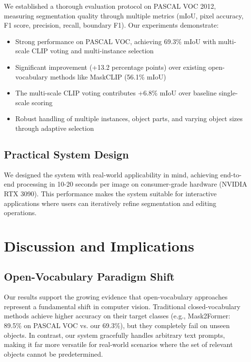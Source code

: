 We established a thorough evaluation protocol on PASCAL VOC 2012, measuring segmentation quality through multiple metrics (mIoU, pixel accuracy, F1 score, precision, recall, boundary F1). Our experiments demonstrate:

\begin{itemize}
    \item Strong performance on PASCAL VOC, achieving 69.3\% mIoU with multi-scale CLIP voting and multi-instance selection
    \item Significant improvement (+13.2 percentage points) over existing open-vocabulary methods like MaskCLIP (56.1\% mIoU)
    \item The multi-scale CLIP voting contributes +6.8\% mIoU over baseline single-scale scoring
    \item Robust handling of multiple instances, object parts, and varying object sizes through adaptive selection
\end{itemize}

\subsection{Practical System Design}

We designed the system with real-world applicability in mind, achieving end-to-end processing in 10-20 seconds per image on consumer-grade hardware (NVIDIA RTX 3090). This performance makes the system suitable for interactive applications where users can iteratively refine segmentation and editing operations.

\section{Discussion and Implications}

\subsection{Open-Vocabulary Paradigm Shift}

Our results support the growing evidence that open-vocabulary approaches represent a fundamental shift in computer vision. Traditional closed-vocabulary methods achieve higher accuracy on their target classes (e.g., Mask2Former: 89.5\% on PASCAL VOC vs. our 69.3\%), but they completely fail on unseen objects. In contrast, our system gracefully handles arbitrary text prompts, making it far more versatile for real-world scenarios where the set of relevant objects cannot be predetermined.

